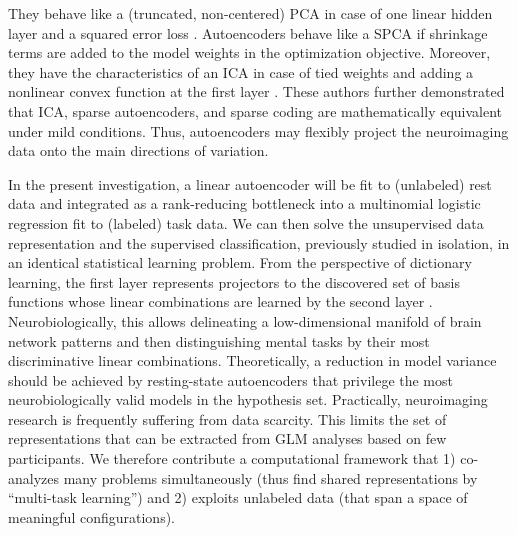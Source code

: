 \documentclass{article} %
\begin{document}
They behave like a (truncated, non-centered) PCA
in case of one linear hidden layer and a squared error loss
\cite{baldi1989neural}.
Autoencoders behave like a SPCA if shrinkage terms are added to the
model weights in the optimization objective.
Moreover, they have the characteristics of an ICA in case of tied weights
and adding a nonlinear convex function
at the first layer \cite{le2011ica}.
These authors further demonstrated that ICA, sparse autoencoders, and 
sparse coding are mathematically equivalent
under mild conditions.
%
Thus, autoencoders may flexibly project the neuroimaging data
onto the main directions of variation.

In the present investigation,
a linear autoencoder will be fit to
(unlabeled) rest data and
integrated as a rank-reducing bottleneck
into a multinomial
logistic regression fit to
(labeled) task data.
We can then solve the unsupervised data representation and the
supervised classification, previously studied in isolation,
in an identical statistical learning problem.
%
From the perspective of dictionary learning, the first layer represents
projectors to the discovered set of basis functions
whose linear combinations are learned
by the second layer \cite{olshausen96}.
%
Neurobiologically, this allows 
delineating a low-dimensional manifold
of brain network patterns and then 
distinguishing mental tasks
by their most discriminative linear combinations.
%
Theoretically, a reduction in model variance should be achieved by
resting-state autoencoders that
privilege the most neurobiologically
valid models in the hypothesis set.
%
Practically, neuroimaging research is frequently suffering from
data scarcity. This limits the set of representations that can be
extracted from GLM analyses based on few participants.
%
We therefore contribute a computational framework that
1) co-analyzes many problems simultaneously
(thus find shared representations by ``multi-task learning'')
and
2) exploits unlabeled data
(that span a space of meaningful configurations).
\end{document}
